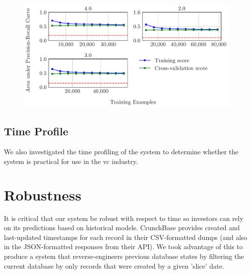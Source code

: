 \documentclass[../thesis/thesis.tex]{subfiles}
\begin{document}
\begin{figure}[!htb]
    \centering
    \includegraphics[width=\textwidth]{../figures/evaluation/efficiency_learning_curve} %
    \caption[Learning curve]{}
    \label{fig:evaluation:efficiency_learning_curve}
\end{figure}

\subsection{Time Profile}

We also investigated the time profiling of the system to determine whether the system is practical for use in the \gls{vc} industry. %

\begin{table}[!htb]
    \centering
    \scalebox{0.9}{}
    \caption[System time profile]{}
    \label{fig:evaluation:time_profile}
\end{table}

\section{Robustness}

It is critical that our system be robust with respect to time so investors can rely on its predictions based on historical models. CrunchBase provides created and last-updated timestamps for each record in their CSV-formatted dumps (and also in the JSON-formatted responses from their API). We took advantage of this to produce a system that reverse-engineers previous database states by filtering the current database by only records that were created by a given 'slice' date.
\end{document}
